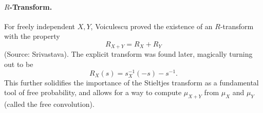 \paragraph{$R$-Transform.} For freely independent $X,Y$, Voiculescu proved the existence of an $R$-transform with the property
\[
    R_{X + Y} = R_X + R_Y
\]
(Source: Srivastava). The explicit transform was found later, magically turning out to be
\[
    R_X(s) = s_X^{-1}(-s) - s^{-1}.
\]
This further solidifies the importance of the Stieltjes transform as a fundamental tool of free probability, and allows for a way to compute $\mu_{X + Y}$ from $\mu_X$ and $\mu_Y$ (called the free convolution).


